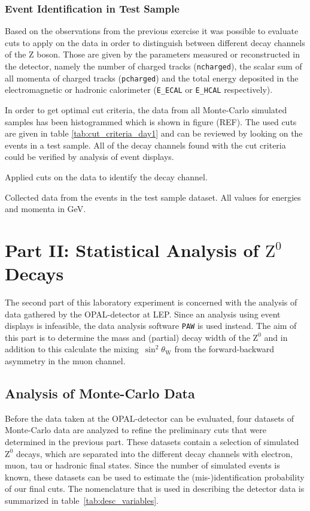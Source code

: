 \documentclass[11pt, a4paper]{article}
\numberwithin{equation}{section}
\newcommand{\korr}[1]{{\color{red}(#1)}}
\begin{document}
\subsubsection{Event Identification in Test Sample}

Based on the observations from the previous exercise it was possible to evaluate cuts to apply on the data in order to distinguish between different decay channels of the Z boson.
Those are given by the parameters measured or reconstructed in the detector, namely the number of charged tracks (\texttt{ncharged}), the scalar sum of all momenta of charged tracks (\texttt{pcharged}) and the total energy deposited in the electromagnetic or hadronic calorimeter (\texttt{E\_ECAL} or \texttt{E\_HCAL} respectively).

In order to get optimal cut criteria, the data from all Monte-Carlo simulated samples has been histogrammed which is shown in figure \korr{REF}.
The used cuts are given in table \ref{tab:cut_criteria_day1} and can be reviewed by looking on the events in a test sample.
All of the decay channels found with the cut criteria could be verified by analysis of event displays.
\begin{table}[h]
	\centering
	
	\caption{Applied cuts on the data to identify the decay channel.}
	\label{tab:cut_criteria_day1}
\end{table}
\begin{table}
	\centering
		
	\caption{Collected data from the events in the test sample dataset. All values for energies and momenta in \si{GeV}.}
\end{table}

\clearpage
\section{Part II: Statistical Analysis of $\mathrm{Z}^0$ Decays}
The second part of this laboratory experiment is concerned with the analysis of data gathered by the OPAL-detector at LEP.
Since an analysis using event displays is infeasible, the data analysis software \texttt{PAW} is used instead.
The aim of this part is to determine the mass and (partial) decay width of the $\mathrm{Z}^0$ and in addition to this calculate the mixing~$\sin^2\theta_\mathrm{W}$ from the forward-backward asymmetry in the muon channel.

\subsection{Analysis of Monte-Carlo Data}
Before the data taken at the OPAL-detector can be evaluated, four datasets of Monte-Carlo data are analyzed to refine the preliminary cuts that were determined in the previous part.
These datasets contain a selection of simulated $\mathrm{Z}^0$ decays, which are separated into the different decay channels with electron, muon, tau or hadronic final states.
Since the number of simulated events is known, these datasets can be used to estimate the (mis-)identification probability of our final cuts.
The nomenclature that is used in describing the detector data is summarized in table~\ref{tab:desc_variables}.
\end{document}
